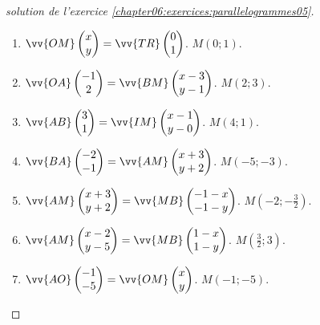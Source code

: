 \documentclass[main.tex]{subfiles}
\begin{document}
\begin{proof}[solution de l'exercice  \ref{chapter06:exercices:parallelogrammes05}]   
	\begin{enumerate}[label=\alph*)]
		\item $\vv{OM}\begin{pmatrix}
			x\\ y 
		\end{pmatrix} =\vv{TR}\begin{pmatrix}
			0\\ 1
		\end{pmatrix}$. $M(0;1)$.
		\item $\vv{OA}\begin{pmatrix}
			-1\\ 2 
		\end{pmatrix} =\vv{BM}\begin{pmatrix}
			x-3\\ y-1
		\end{pmatrix}$. $M(2;3)$.
		\item $\vv{AB}\begin{pmatrix}
			3\\ 1 
		\end{pmatrix} =\vv{IM}\begin{pmatrix}
			x-1\\ y-0
		\end{pmatrix}$. $M(4;1)$.
		\item $\vv{BA}\begin{pmatrix}
			-2\\ -1 
		\end{pmatrix} =\vv{AM}\begin{pmatrix}
			x+3\\ y+2
		\end{pmatrix}$. $M(-5;-3)$.
		\item $\vv{AM}\begin{pmatrix}
			x+3\\ y+2 
		\end{pmatrix} =\vv{MB}\begin{pmatrix}
			-1-x\\ -1-y
		\end{pmatrix}$. $M(-2;-\tfrac{3}{2})$.
		\item $\vv{AM}\begin{pmatrix}
			x-2\\ y-5 
		\end{pmatrix} =\vv{MB}\begin{pmatrix}
			1-x\\ 1-y
		\end{pmatrix}$. $M(\tfrac{3}{2};3)$.
		\item $\vv{AO}\begin{pmatrix}
			-1\\ -5 
		\end{pmatrix} =\vv{OM}\begin{pmatrix}
			x\\ y
		\end{pmatrix}$. $M(-1;-5)$.
	\end{enumerate} 
\end{proof}
\end{document}

